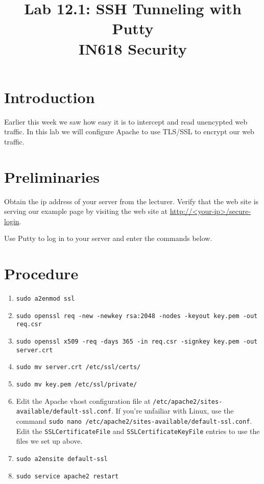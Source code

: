 \documentclass{article}
\begin{document}
\title{ Lab 12.1: SSH Tunneling with Putty  \\ IN618 Security}
\maketitle

\section*{Introduction}
Earlier this week we saw how easy it is to intercept and read unencypted web traffic.  In this lab we will configure Apache to use TLS/SSL to encrypt our web traffic.

\section{Preliminaries}
Obtain the ip address of your server from the lecturer.  Verify that the web site is serving our example page by visiting the web site at \url{http://<your-ip>/secure-login}.

Use Putty to log in to your server and enter the commands below.


\section{Procedure}
\begin{enumerate}
	\item \texttt{sudo a2enmod ssl}
	\item \texttt{sudo openssl req -new -newkey rsa:2048 -nodes -keyout key.pem -out req.csr}
	\item \texttt{sudo openssl x509 -req -days 365 -in req.csr -signkey key.pem -out server.crt}
	\item \texttt{sudo mv server.crt /etc/ssl/certs/}
	\item \texttt{sudo mv key.pem /etc/ssl/private/}
	\item  Edit the Apache vhost configuration file at \texttt{/etc/apache2/sites-available/default-ssl.conf}.  If you're unfailiar with Linux, use the command \texttt{sudo nano /etc/apache2/sites-available/default-ssl.conf}.  Edit the \texttt{SSLCertificateFile} and \texttt{SSLCertificateKeyFile} entries to use the files we set up above.
	\item \texttt{sudo a2ensite default-ssl}
	\item \texttt{sudo service apache2 restart}
	
	

\end{enumerate}
\end{document}
